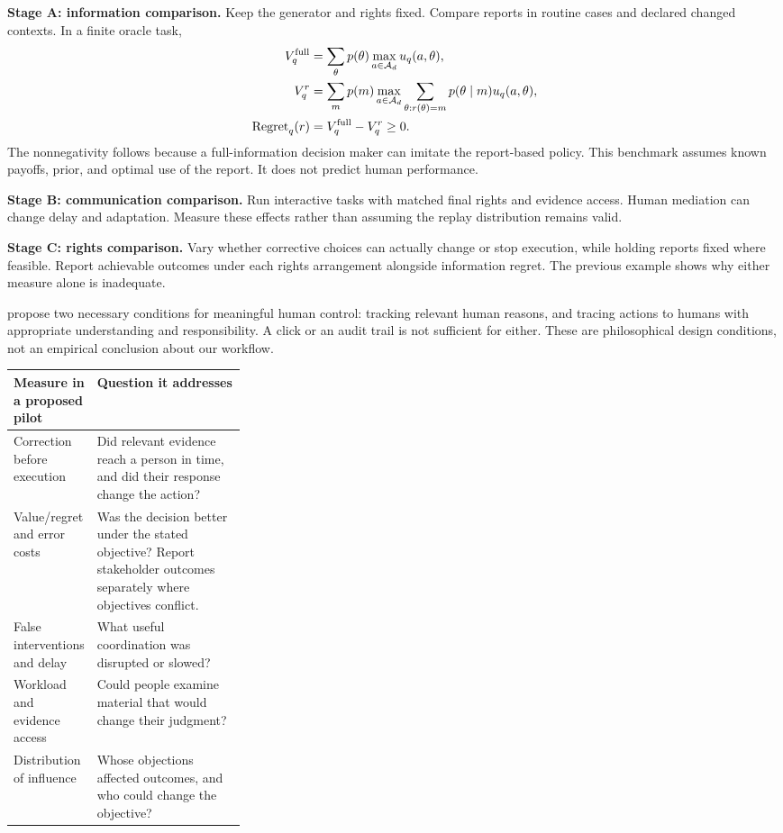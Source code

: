 \documentclass[11pt,letterpaper]{article}
\begin{document}
\textbf{Stage A: information comparison.} Keep the generator and rights fixed. Compare reports in routine cases and declared changed contexts. In a finite oracle task,
\begin{align}
 V_q^{\rm full}&=\sum_\theta p(\theta)\max_{a\in\mathcal A_d}u_q(a,\theta),\\
 V_q^r&=\sum_m p(m)\max_{a\in\mathcal A_d}
                  \sum_{\theta:r(\theta)=m}p(\theta\mid m)u_q(a,\theta),\\
 \mathrm{Regret}_q(r)&=V_q^{\rm full}-V_q^r\geq0.
\end{align}
The nonnegativity follows because a full-information decision maker can imitate the report-based policy. This benchmark assumes known payoffs, prior, and optimal use of the report. It does not predict human performance.

\textbf{Stage B: communication comparison.} Run interactive tasks with matched final rights and evidence access. Human mediation can change delay and adaptation. Measure these effects rather than assuming the replay distribution remains valid.

\textbf{Stage C: rights comparison.} Vary whether corrective choices can actually change or stop execution, while holding reports fixed where feasible. Report achievable outcomes under each rights arrangement alongside information regret. The previous example shows why either measure alone is inadequate.

\citet[PDF pp. 7--9]{santoni2018control} propose two necessary conditions for meaningful human control: tracking relevant human reasons, and tracing actions to humans with appropriate understanding and responsibility. A click or an audit trail is not sufficient for either. These are philosophical design conditions, not an empirical conclusion about our workflow.

\begin{tabularx}{\linewidth}{L{0.30\linewidth}Y}\toprule
Measure in a proposed pilot & Question it addresses \\\midrule
Correction before execution & Did relevant evidence reach a person in time, and did their response change the action? \\
Value/regret and error costs & Was the decision better under the stated objective? Report stakeholder outcomes separately where objectives conflict. \\
False interventions and delay & What useful coordination was disrupted or slowed? \\
Workload and evidence access & Could people examine material that would change their judgment? \\
Distribution of influence & Whose objections affected outcomes, and who could change the objective? \\\bottomrule
\end{tabularx}
\end{document}
